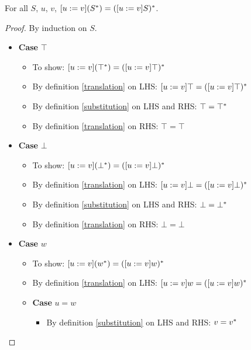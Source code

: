 \begin{LEMMA}
    \label{comm_trans_sub}
    For all $S$, $u$, $v$, $[u := v](S^{*}) = ([u := v]S)^{*}$.
\end{LEMMA}

\begin{proof}
    By induction on $S$.
    \begin{itemize}
        \item \textbf{Case} $\top$
        \begin{itemize}
            \item To show: $[u := v](\top^{*}) = ([u := v]\top)^{*}$
            \item By definition \ref{translation} on LHS:
                $[u := v]\top = ([u := v]\top)^{*}$
            \item By definition \ref{substitution} on LHS and RHS:
                $\top = \top^{*}$
            \item By definition \ref{translation} on RHS: $\top = \top$
        \end{itemize}
        \item \textbf{Case} $\bot$
        \begin{itemize}
            \item To show: $[u := v](\bot^{*}) = ([u := v]\bot)^{*}$
            \item By definition \ref{translation} on LHS:
                $[u := v]\bot = ([u := v]\bot)^{*}$
            \item By definition \ref{substitution} on LHS and RHS:
                $\bot = \bot^{*}$
            \item By definition \ref{translation} on RHS: $\bot = \bot$
        \end{itemize}
        \item \textbf{Case} $w$
        \begin{itemize}
            \item To show: $[u := v](w^{*}) = ([u := v]w)^{*}$
            \item By definition \ref{translation} on LHS:
                $[u := v]w = ([u := v]w)^{*}$
            \item \textbf{Case} $u = w$
            \begin{itemize}
                \item By definition \ref{substitution} on LHS and RHS:
                    $v = v^{*}$

\end{itemize}
\end{itemize}
\end{itemize}
\end{proof}
